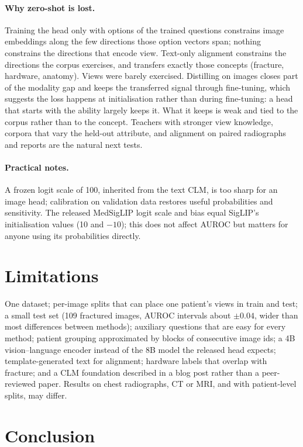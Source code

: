 \documentclass[11pt]{article}
\begin{document}
\paragraph{Why zero-shot is lost.} Training the head only with options of the trained questions constrains image
embeddings along the few directions those option vectors span; nothing constrains the directions that encode view.
Text-only alignment constrains the directions the corpus exercises, and transfers exactly those concepts (fracture,
hardware, anatomy). Views were barely exercised. Distilling on images closes part of the modality gap and keeps the
transferred signal through fine-tuning, which suggests the loss happens at initialisation rather than during
fine-tuning: a head that starts with the ability largely keeps it. What it keeps is weak and tied to the corpus
rather than to the concept. Teachers with stronger view knowledge, corpora that vary the held-out attribute,
and alignment on paired radiographs and reports are the natural next tests.

\paragraph{Practical notes.} A frozen logit scale of 100, inherited from the text CLM, is too sharp for an image head;
calibration on validation data restores useful probabilities and sensitivity. The released MedSigLIP logit scale and
bias equal SigLIP's initialisation values (10 and $-10$); this does not affect AUROC but matters for anyone using its
probabilities directly.

\section{Limitations}

One dataset; per-image splits that can place one patient's views in train and test; a small test set (109
fractured images, AUROC intervals about $\pm0.04$, wider than most differences between methods); auxiliary questions
that are easy for every method; patient grouping approximated by blocks of consecutive image ids; a 4B vision--language encoder instead of the 8B
model the released head expects;
template-generated text for alignment; hardware labels that overlap with fracture; and a CLM foundation described in
a blog post rather than a peer-reviewed paper. Results on chest radiographs, CT or MRI, and with patient-level splits,
may differ.

\section{Conclusion}
\end{document}
